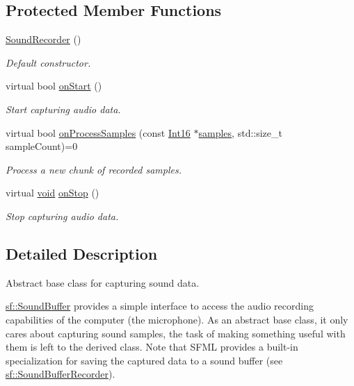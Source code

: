 \subsection*{Protected Member Functions}
\begin{DoxyCompactItemize}
\item 
\hyperlink{classsf_1_1_sound_recorder_a50ebad413c4f157408a0fa49f23212a9}{Sound\-Recorder} ()
\begin{DoxyCompactList}\small\item\em Default constructor. \end{DoxyCompactList}\item 
virtual bool \hyperlink{classsf_1_1_sound_recorder_a7af418fb036201d3f85745bef78ce77f}{on\-Start} ()
\begin{DoxyCompactList}\small\item\em Start capturing audio data. \end{DoxyCompactList}\item 
virtual bool \hyperlink{classsf_1_1_sound_recorder_a2670124cbe7a87c7e46b4840807f4fd7}{on\-Process\-Samples} (const \hyperlink{namespacesf_a3c8e10435e2a310a7741755e66b5c94e}{Int16} $\ast$\hyperlink{gl3_8h_aba70cd077c2c52c15358c231c6d293aa}{samples}, std\-::size\-\_\-t sample\-Count)=0
\begin{DoxyCompactList}\small\item\em Process a new chunk of recorded samples. \end{DoxyCompactList}\item 
virtual \hyperlink{glutf90_8h_ac778d6f63f1aaf8ebda0ce6ac821b56e}{void} \hyperlink{classsf_1_1_sound_recorder_aefc36138ca1e96c658301280e4a31b64}{on\-Stop} ()
\begin{DoxyCompactList}\small\item\em Stop capturing audio data. \end{DoxyCompactList}\end{DoxyCompactItemize}


\subsection{Detailed Description}
Abstract base class for capturing sound data. 

\hyperlink{classsf_1_1_sound_buffer}{sf\-::\-Sound\-Buffer} provides a simple interface to access the audio recording capabilities of the computer (the microphone). As an abstract base class, it only cares about capturing sound samples, the task of making something useful with them is left to the derived class. Note that S\-F\-M\-L provides a built-\/in specialization for saving the captured data to a sound buffer (see \hyperlink{classsf_1_1_sound_buffer_recorder}{sf\-::\-Sound\-Buffer\-Recorder}).

